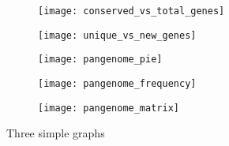 \begin{figure}[h!]	%
     \centering
     \begin{subfigure}[b]{0.4\textwidth}
         \centering
         \texttt{[image: conserved\_vs\_total\_genes]}
         \caption{}
         \label{fig:conserved vs total}
     \end{subfigure}
     \hfill
     \begin{subfigure}[b]{0.4\textwidth}
         \centering
         \texttt{[image: unique\_vs\_new\_genes]}
         \caption{}
         \label{fig:unique vs new}
     \end{subfigure}
     \hfill
     \begin{subfigure}[b]{0.45\textwidth}
         \centering
         \texttt{[image: pangenome\_pie]}
         \caption{}
         \label{fig:pangenome pie}
     \end{subfigure}
     \hfill
     \begin{subfigure}[b]{0.45\textwidth}
         \centering
         \texttt{[image: pangenome\_frequency]}
         \caption{}
         \label{fig:pangeome frequency}
     \end{subfigure}
     \hfill
     \begin{subfigure}[b]{0.85\textwidth}
         \centering
         \texttt{[image: pangenome\_matrix]}
         \caption{}
         \label{fig:pangenome matrix}
     \end{subfigure}
        \caption{Three simple graphs}
        \label{fig:pangenome}
\end{figure}



% 





















